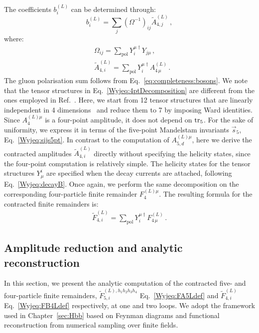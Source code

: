 \documentclass[main.tex]{subfiles}
\begin{document}
The coefficients $b_i^{(L)}$ can be determined through:
\begin{equation}
b^{(L)}_{i} = \sum_{j} \left(\Omega^{-1}\right)_{ij}  \tilde{A}^{(L)}_{4,j} \,,
\label{Wyjeq:solvebi}
\end{equation}
where:
\begin{align}
\label{Wyjeq:Omega}
& \Omega_{ij} = \sum_{\text{pol}} Y^{\mu\dagger}_{i} Y_{j\mu} \,, \\
\label{Wyjeq:B4Ldef}
& \tilde{A}^{(L)}_{4,i} = \sum_{\text{pol}} Y^{\mu\dagger}_{i} A^{(L)}_{4 \, \mu} \,.
\end{align}
The gluon polarisation sum follows from Eq.~\ref{eq:completeness:bosons}.
We note that the tensor structures in Eq.~\ref{Wyjeq:4ptDecomposition} are different from the ones employed in Ref.~\cite{Garland:2002ak}.
Here, we start from 12 tensor structures that are linearly independent in 4 dimensions~\cite{Peraro:2019cjj,Peraro:2020sfm} and reduce them to 7 by imposing Ward identities.
Since $A^{(L)\mu}_4$ is a four-point amplitude, it does not depend on $\operatorname{\rm tr}_5$. For the sake of uniformity, we express it in terms of the five-point Mandelstam invariants $\vec{s}_5$, Eq.~\ref{Wyjeq:sijs5pt}. 
In contrast to the computation of $A^{(L)\mu}_{5,d}$, here we derive the contracted amplitudes $\tilde{A}^{(L)}_{4,i}$ directly without specifying the helicity states, since the four-point computation
is relatively simple. The helicity states for the tensor structures $Y_\mu^{i}$ are specified when the decay currents are attached, following Eq.~\ref{Wyjeq:decayB}. Once again, we perform the same decomposition on the corresponding four-particle finite remainder $F^{(L)\mu}_{4}$. The resulting formula for the contracted finite remainders is:
\begin{align} \label{Wyjeq:FB4Ldef}
\tilde{F}^{(L)}_{4,i} = \sum_{\text{pol}} Y^{\mu\dagger}_{i} F^{(L)}_{4 \, \mu} \,.
\end{align}
\subsection{Amplitude reduction and analytic reconstruction}
\label{wyjsec:Reconstruction}
In this section, we present the analytic computation of the contracted five- and four-particle finite remainders, $\tilde{F}_{5,i}^{(L),h_1 h_2 h_3 h_4}$ Eq.~\ref{Wyjeq:FA5Ldef} and $\tilde{F}_{4,i}^{(L)}$ Eq.~\ref{Wyjeq:FB4Ldef} respectively, at one and two loops. We adopt the framework used in Chapter~\ref{sec:Hbb} based on Feynman diagrams and functional reconstruction from numerical sampling over finite fields. 
\end{document}
